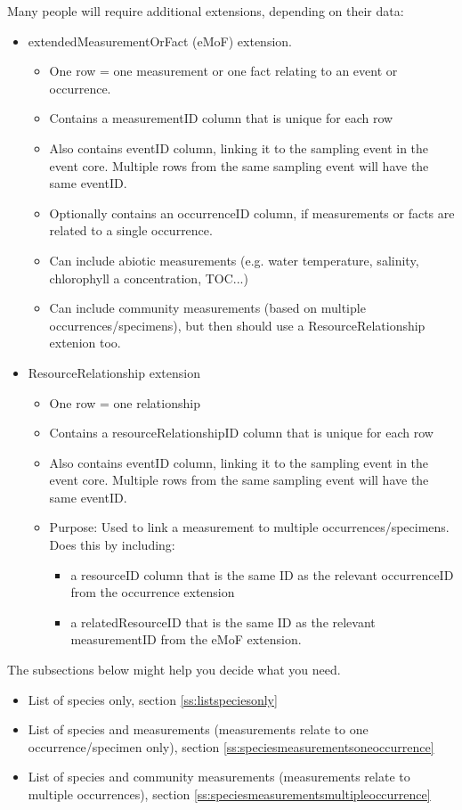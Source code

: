 \documentclass[a4paper,english, 11pt]{article}
\begin{document}
Many people will require additional extensions, depending on their data:

\begin{itemize}
\item extendedMeasurementOrFact (eMoF) extension.
\begin{itemize}
\item One row = one measurement or one fact relating to an event or occurrence.
\item Contains a measurementID column that is unique for each row
\item Also contains eventID column, linking it to the sampling event in the event core. Multiple rows from the same sampling event will have the same eventID.
\item Optionally contains an occurrenceID column, if measurements or facts are related to a single occurrence.
\item Can include abiotic measurements (e.g. water temperature, salinity, chlorophyll a concentration, TOC...)
\item Can include community measurements (based on multiple occurrences/specimens), but then should use a ResourceRelationship extenion too. 
\end{itemize}
\item ResourceRelationship extension
\begin{itemize}
\item One row = one relationship
\item Contains a resourceRelationshipID column that is unique for each row
\item Also contains eventID column, linking it to the sampling event in the event core. Multiple rows from the same sampling event will have the same eventID.
\item Purpose: Used to link a measurement to multiple occurrences/specimens. Does this by including:
\begin{itemize}
\item a resourceID column that is the same ID as the relevant occurrenceID from the occurrence extension 
\item a relatedResourceID that is the same ID as the relevant measurementID from the eMoF extension.  
\end{itemize}
\end{itemize}
\end{itemize}

The subsections below might help you decide what you need.
\begin{itemize}
\item List of species only, section \ref{ss:listspeciesonly}
\item List of species and measurements (measurements relate to one occurrence/specimen only), section \ref{ss:speciesmeasurementsoneoccurrence}
\item List of species and community measurements (measurements relate to multiple occurrences), section \ref{ss:speciesmeasurementsmultipleoccurrence}
\end{itemize}
\end{document}
